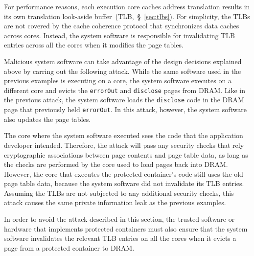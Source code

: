 For performance reasons, each execution core caches address translation results
in its own translation look-aside buffer~(TLB,~\S~\ref{sec:tlbs}). For
simplicity, the TLBs are not covered by the cache coherence protocol that
synchronizes data caches across cores. Instead, the system software is
responsible for invalidating TLB entries across all the cores when it modifies
the page tables.

Malicious system software can take advantage of the design decisions explained
above by carring out the following attack. While the same software used in the
previous examples is executing on a core, the system software executes on a
different core and evicts the \texttt{errorOut} and \texttt{disclose} pages
from DRAM. Like in the previous attack, the system software loads the
\texttt{disclose} code in the DRAM page that previously held \texttt{errorOut}.
In this attack, however, the system software also updates the page tables.

The core where the system software executed sees the code that the application
developer intended. Therefore, the attack will pass any security checks that
rely cryptographic associations between page contents and page table data, as
long as the checks are performed by the core used to load pages back into DRAM.
However, the core that executes the protected container's code still uses the
old page table data, because the system software did not invalidate its TLB
entries. Assuming the TLBs are not subjected to any additional security checks,
this attack causes the same private information leak as the previous examples.

In order to avoid the attack described in this section, the trusted software or
hardware that implements protected containers must also ensure that the system
software invalidates the relevant TLB entries on all the cores when it evicts a
page from a protected container to DRAM.
